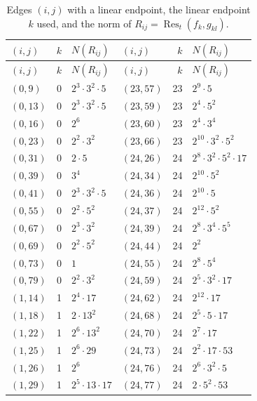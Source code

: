 \documentclass[11pt]{article}
\begin{document}
\begingroup\small
\setlength{\LTcapwidth}{\textwidth}
\begin{longtable}{@{}lrl@{\qquad}lrl@{}}
\caption{Edges $(i,j)$ with a linear endpoint, the linear endpoint $k$ used, and the norm of $R_{ij}=\operatorname{Res}_t(f_k,g_{kl})$.}\label{tab:sep}\\
\hline $(i,j)$ & $k$ & $N(R_{ij})$ & $(i,j)$ & $k$ & $N(R_{ij})$\\\hline\endfirsthead\hline $(i,j)$ & $k$ & $N(R_{ij})$ & $(i,j)$ & $k$ & $N(R_{ij})$\\\hline\endhead\hline\endfoot
$(0,9)$ & 0 & $2^{3}\cdot 3^{2}\cdot 5$ & $(23,57)$ & 23 & $2^{9}\cdot 5$\\
$(0,13)$ & 0 & $2^{3}\cdot 3^{2}\cdot 5$ & $(23,59)$ & 23 & $2^{4}\cdot 5^{2}$\\
$(0,16)$ & 0 & $2^{6}$ & $(23,60)$ & 23 & $2^{4}\cdot 3^{4}$\\
$(0,23)$ & 0 & $2^{2}\cdot 3^{2}$ & $(23,66)$ & 23 & $2^{10}\cdot 3^{2}\cdot 5^{2}$\\
$(0,31)$ & 0 & $2\cdot 5$ & $(24,26)$ & 24 & $2^{8}\cdot 3^{2}\cdot 5^{2}\cdot 17$\\
$(0,39)$ & 0 & $3^{4}$ & $(24,34)$ & 24 & $2^{10}\cdot 5^{2}$\\
$(0,41)$ & 0 & $2^{3}\cdot 3^{2}\cdot 5$ & $(24,36)$ & 24 & $2^{10}\cdot 5$\\
$(0,55)$ & 0 & $2^{2}\cdot 5^{2}$ & $(24,37)$ & 24 & $2^{12}\cdot 5^{2}$\\
$(0,67)$ & 0 & $2^{3}\cdot 3^{2}$ & $(24,39)$ & 24 & $2^{8}\cdot 3^{4}\cdot 5^{5}$\\
$(0,69)$ & 0 & $2^{2}\cdot 5^{2}$ & $(24,44)$ & 24 & $2^{2}$\\
$(0,73)$ & 0 & $1$ & $(24,55)$ & 24 & $2^{8}\cdot 5^{4}$\\
$(0,79)$ & 0 & $2^{2}\cdot 3^{2}$ & $(24,59)$ & 24 & $2^{5}\cdot 3^{2}\cdot 17$\\
$(1,14)$ & 1 & $2^{4}\cdot 17$ & $(24,62)$ & 24 & $2^{12}\cdot 17$\\
$(1,18)$ & 1 & $2\cdot 13^{2}$ & $(24,68)$ & 24 & $2^{5}\cdot 5\cdot 17$\\
$(1,22)$ & 1 & $2^{6}\cdot 13^{2}$ & $(24,70)$ & 24 & $2^{7}\cdot 17$\\
$(1,25)$ & 1 & $2^{6}\cdot 29$ & $(24,73)$ & 24 & $2^{2}\cdot 17\cdot 53$\\
$(1,26)$ & 1 & $2^{6}$ & $(24,76)$ & 24 & $2^{6}\cdot 3^{2}\cdot 5$\\
$(1,29)$ & 1 & $2^{5}\cdot 13\cdot 17$ & $(24,77)$ & 24 & $2\cdot 5^{2}\cdot 53$\\

\end{longtable}
\end{document}
